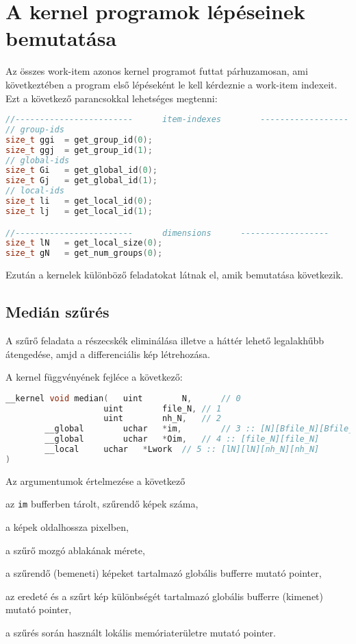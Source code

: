 \chapter{A kernel programok lépéseinek bemutatása}
Az összes work-item azonos kernel programot futtat párhuzamosan, ami következtében a program első lépéseként le kell kérdeznie a
work-item indexeit. Ezt a következő parancsokkal lehetséges megtenni:
\begin{lstlisting}[language=C++]
//------------------------		item-indexes		------------------
// group-ids
size_t ggi	= get_group_id(0);
size_t ggj	= get_group_id(1);
// global-ids
size_t Gi	= get_global_id(0);
size_t Gj	= get_global_id(1);
// local-ids
size_t li	= get_local_id(0);
size_t lj	= get_local_id(1);

//------------------------		dimensions		------------------
size_t lN	= get_local_size(0);
size_t gN	= get_num_groups(0);
\end{lstlisting}

\noindent Ezután a kernelek különböző feladatokat látnak el, amik bemutatása következik. 
\section{Medián szűrés}
	A szűrő feladata a részecskék eliminálása illetve a háttér lehető legalakhűbb átengedése, amjd a differenciális kép létrehozása.
	
\noindent A kernel függvényének fejléce a következő:
\begin{lstlisting}[language=C++]
__kernel void median(	uint		N,		// 0
					uint		file_N,	// 1
					uint		nh_N,	// 2
		__global		uchar	*im,		// 3 :: [N][Bfile_N][Bfile_N]					
		__global		uchar	*Oim,	// 4 :: [file_N][file_N]
		__local		uchar	*Lwork	// 5 :: [lN][lN][nh_N][nh_N]
)
\end{lstlisting}

\noindent Az argumentumok értelmezése a következő
	\begin{description}[noitemsep]
		\item[\texttt{N}] az \texttt{im} bufferben tárolt, szűrendő képek száma,
		\item[\texttt{file\_N}] a képek oldalhossza pixelben,
		\item[\texttt{nh\_N}] a szűrő mozgó ablakának mérete,
		\item[\texttt{im}] a szűrendő (bemeneti) képeket tartalmazó globális bufferre mutató pointer,
		\item[\texttt{Oim}] az eredeté és a szűrt kép különbségét tartalmazó globális bufferre (kimenet) mutató pointer,
		\item[\texttt{Lwork}] a szűrés során használt lokális memóriaterületre mutató pointer.
	\end{description}
	
